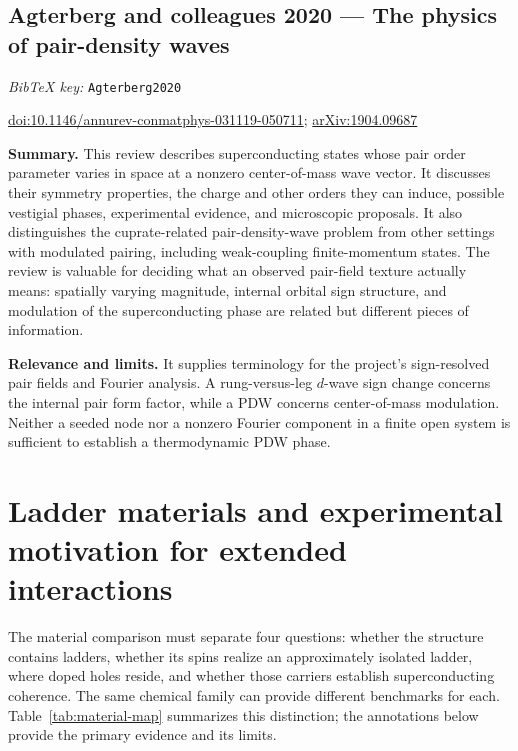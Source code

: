 \documentclass[11pt]{article}
\newcommand{\paper}[2]{\Needspace{8\baselineskip}\subsection{#2}\label{paper:#1}\textit{BibTeX key:} \texttt{#1}\quad\citep{#1}\par}
\newcommand{\doi}[1]{\href{https://doi.org/#1}{doi:#1}}
\newcommand{\arxiv}[1]{\href{https://arxiv.org/abs/#1}{arXiv:#1}}
\newcommand{\summary}{\par\textbf{Summary.} }
\newcommand{\relevance}{\par\textbf{Relevance and limits.} }
\begin{document}
\paper{Agterberg2020}{Agterberg and colleagues 2020 --- The physics of pair-density waves}
\doi{10.1146/annurev-conmatphys-031119-050711}; \arxiv{1904.09687}
\summary This review describes superconducting states whose pair order parameter varies in space at a nonzero center-of-mass wave vector. It discusses their symmetry properties, the charge and other orders they can induce, possible vestigial phases, experimental evidence, and microscopic proposals. It also distinguishes the cuprate-related pair-density-wave problem from other settings with modulated pairing, including weak-coupling finite-momentum states. The review is valuable for deciding what an observed pair-field texture actually means: spatially varying magnitude, internal orbital sign structure, and modulation of the superconducting phase are related but different pieces of information.
\relevance It supplies terminology for the project's sign-resolved pair fields and Fourier analysis. A rung-versus-leg $d$-wave sign change concerns the internal pair form factor, while a PDW concerns center-of-mass modulation. Neither a seeded node nor a nonzero Fourier component in a finite open system is sufficient to establish a thermodynamic PDW phase.

\section{Ladder materials and experimental motivation for extended interactions}
\label{sec:materials-review}
The material comparison must separate four questions: whether the structure
contains ladders, whether its spins realize an approximately isolated ladder,
where doped holes reside, and whether those carriers establish superconducting
coherence. The same chemical family can provide different benchmarks for each.
Table~\ref{tab:material-map} summarizes this distinction; the annotations below
provide the primary evidence and its limits.
\end{document}
